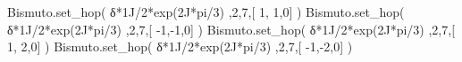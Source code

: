 \documentclass[
  letterpaper,
  DIV=11,
  numbers=noendperiod]{scrreprt}
\newenvironment{Shaded}{\begin{snugshade}}{\end{snugshade}}
\newcommand{\DecValTok}[1]{\textcolor[rgb]{0.68,0.00,0.00}{#1}}
\newcommand{\NormalTok}[1]{\textcolor[rgb]{0.00,0.23,0.31}{#1}}
\newcommand{\OperatorTok}[1]{\textcolor[rgb]{0.37,0.37,0.37}{#1}}
\newcommand{\OtherTok}[1]{\textcolor[rgb]{0.00,0.23,0.31}{#1}}
\begin{document}
\begin{Shaded}
\begin{Highlighting}[]
\NormalTok{Bismuto.set\_hop(   δ}\OperatorTok{*}\OtherTok{1J}\OperatorTok{/}\DecValTok{2}\OperatorTok{*}\NormalTok{exp(}\OtherTok{2J}\OperatorTok{*}\NormalTok{pi}\OperatorTok{/}\DecValTok{3}\NormalTok{) ,}\DecValTok{2}\NormalTok{,}\DecValTok{7}\NormalTok{,[  }\DecValTok{1}\NormalTok{, }\DecValTok{1}\NormalTok{,}\DecValTok{0}\NormalTok{] )}
\NormalTok{Bismuto.set\_hop(   δ}\OperatorTok{*}\OtherTok{1J}\OperatorTok{/}\DecValTok{2}\OperatorTok{*}\NormalTok{exp(}\OtherTok{2J}\OperatorTok{*}\NormalTok{pi}\OperatorTok{/}\DecValTok{3}\NormalTok{) ,}\DecValTok{2}\NormalTok{,}\DecValTok{7}\NormalTok{,[ }\OperatorTok{{-}}\DecValTok{1}\NormalTok{,}\OperatorTok{{-}}\DecValTok{1}\NormalTok{,}\DecValTok{0}\NormalTok{] )}
\NormalTok{Bismuto.set\_hop(   δ}\OperatorTok{*}\OtherTok{1J}\OperatorTok{/}\DecValTok{2}\OperatorTok{*}\NormalTok{exp(}\OtherTok{2J}\OperatorTok{*}\NormalTok{pi}\OperatorTok{/}\DecValTok{3}\NormalTok{) ,}\DecValTok{2}\NormalTok{,}\DecValTok{7}\NormalTok{,[  }\DecValTok{1}\NormalTok{, }\DecValTok{2}\NormalTok{,}\DecValTok{0}\NormalTok{] )}
\NormalTok{Bismuto.set\_hop(   δ}\OperatorTok{*}\OtherTok{1J}\OperatorTok{/}\DecValTok{2}\OperatorTok{*}\NormalTok{exp(}\OtherTok{2J}\OperatorTok{*}\NormalTok{pi}\OperatorTok{/}\DecValTok{3}\NormalTok{) ,}\DecValTok{2}\NormalTok{,}\DecValTok{7}\NormalTok{,[ }\OperatorTok{{-}}\DecValTok{1}\NormalTok{,}\OperatorTok{{-}}\DecValTok{2}\NormalTok{,}\DecValTok{0}\NormalTok{] )}
\end{Highlighting}
\end{Shaded}
\end{document}
